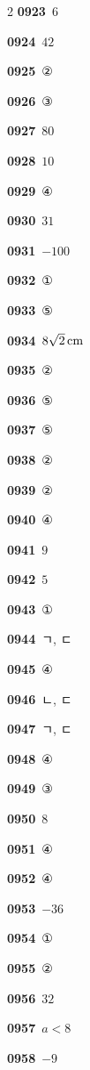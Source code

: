 \documentclass[10pt,a4paper]{article}
\begin{document}
\begin{multicols}{2}
\noindent\textbf{0923}\ $6$\par
\noindent\textbf{0924}\ $42$\par
\noindent\textbf{0925}\ ②\par
\noindent\textbf{0926}\ ③\par
\noindent\textbf{0927}\ $80$\par
\noindent\textbf{0928}\ $10$\par
\noindent\textbf{0929}\ ④\par
\noindent\textbf{0930}\ $31$\par
\noindent\textbf{0931}\ $-100$\par
\noindent\textbf{0932}\ ①\par
\noindent\textbf{0933}\ ⑤\par
\noindent\textbf{0934}\ $8\sqrt{2}\mkern3mu \mathrm{cm}$\par
\noindent\textbf{0935}\ ②\par
\noindent\textbf{0936}\ ⑤\par
\noindent\textbf{0937}\ ⑤\par
\noindent\textbf{0938}\ ②\par
\noindent\textbf{0939}\ ②\par
\noindent\textbf{0940}\ ④\par
\noindent\textbf{0941}\ $9$\par
\noindent\textbf{0942}\ $5$\par
\noindent\textbf{0943}\ ①\par
\noindent\textbf{0944}\ ㄱ, ㄷ\par
\noindent\textbf{0945}\ ④\par
\noindent\textbf{0946}\ ㄴ, ㄷ\par
\noindent\textbf{0947}\ ㄱ, ㄷ\par
\noindent\textbf{0948}\ ④\par
\noindent\textbf{0949}\ ③\par
\noindent\textbf{0950}\ $8$\par
\noindent\textbf{0951}\ ④\par
\noindent\textbf{0952}\ ④\par
\noindent\textbf{0953}\ $-36$\par
\noindent\textbf{0954}\ ①\par
\noindent\textbf{0955}\ ②\par
\noindent\textbf{0956}\ $32$\par
\noindent\textbf{0957}\ $a<8$\par
\noindent\textbf{0958}\ $-9$\par

\end{multicols}
\end{document}
